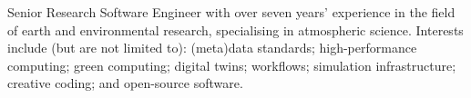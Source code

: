 \par{
Senior Research Software Engineer with over seven years' experience in the field of earth and environmental research, specialising in atmospheric science. Interests include (but are not limited to): (meta)data standards; high-performance computing; green computing; digital twins; workflows; simulation infrastructure; creative coding; and open-source software.
}